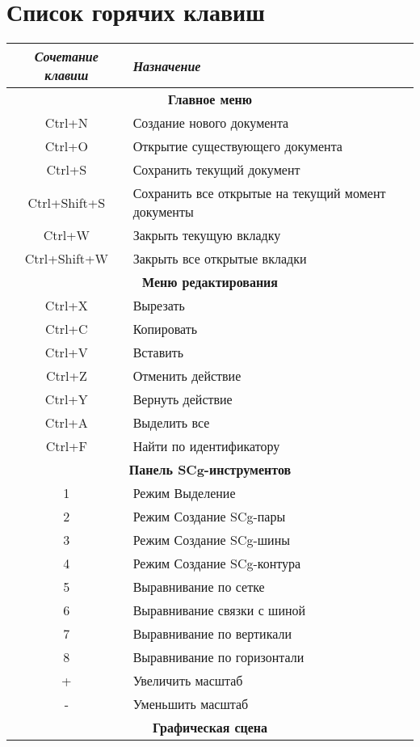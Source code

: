 \newpage
\section{Список горячих клавиш}

\begin{tabular}{|c|l|}
\hline
\textit{Сочетание клавиш} & \textit{Назначение} \\
\hline
\multicolumn{2}{|c|}{\textbf{Главное меню}} \\
\hline
Ctrl+N & Создание нового документа \\
\hline
Ctrl+O & Открытие существующего документа \\
\hline
Ctrl+S & Сохранить текущий документ \\
\hline
Ctrl+Shift+S & Сохранить все открытые на текущий момент документы \\
\hline
Ctrl+W & Закрыть текущую вкладку \\
\hline
Ctrl+Shift+W & Закрыть все открытые вкладки\\
\hline
\multicolumn{2}{|c|}{\textbf{Меню редактирования}} \\
\hline
Ctrl+X & Вырезать \\
\hline
Ctrl+C & Копировать\\
\hline
Ctrl+V & Вставить \\
\hline
Ctrl+Z & Отменить действие \\
\hline
Ctrl+Y & Вернуть действие \\
\hline
Ctrl+A & Выделить все \\
\hline
Ctrl+F & Найти по идентификатору \\
\hline
\multicolumn{2}{|c|}{\textbf{Панель SCg-инструментов}} \\
\hline
1 & Режим Выделение\\
\hline
2 & Режим Создание SCg-пары \\
\hline
3 & Режим Создание SCg-шины \\
\hline
4 & Режим Создание SCg-контура \\
\hline
5 & Выравнивание по сетке \\
\hline
6 & Выравнивание связки с шиной \\
\hline
7 & Выравнивание по вертикали \\
\hline
8 & Выравнивание по горизонтали \\
\hline
+ & Увеличить масштаб \\
\hline
- & Уменьшить масштаб \\
\hline
\multicolumn{2}{|c|}{\textbf{Графическая сцена}} \\

\end{tabular}
